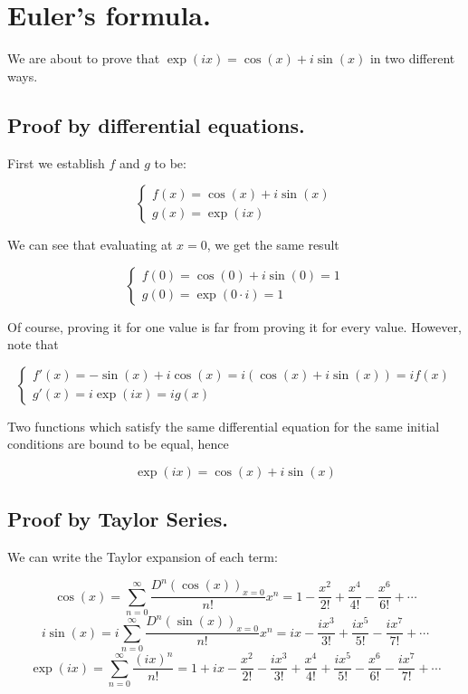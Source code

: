 \section{Euler's formula.}

We are about to prove that $\exp(ix) = \cos(x) + i\sin(x)$ in two different ways.

\subsection{Proof by differential equations.}

First we establish $f$ and $g$ to be:

\begin{equation}
\begin{cases}
	f(x) = \cos(x) + i\sin(x) \\
	g(x) = \exp(ix)
\end{cases}
\end{equation}

We can see that evaluating at $x = 0$, we get the same result

\begin{equation}
\begin{cases}
	f(0) = \cos(0) + i\sin(0) = 1 \\
	g(0) = \exp(0\cdot i) = 1
\end{cases}
\end{equation}

Of course, proving it for one value is far from proving it for every value. However, note that

\begin{equation}
\begin{cases}
	f'(x) = -\sin(x) + i\cos(x) = i(\cos(x) + i\sin(x)) = if(x) \\
	g'(x) = i\exp(ix) = ig(x)
\end{cases}
\end{equation}

Two functions which satisfy the same differential equation for the same initial conditions are bound to be equal, hence

$$\exp(ix) = \cos(x) + i\sin(x)$$

\subsection{Proof by Taylor Series.}

We can write the Taylor expansion of each term:

$$\cos(x)  =  \sum\limits_{n=0}^{\infty} \frac{D^n(\cos(x))_{x=0}}{n!} x^n = 1 - \frac{x^2}{2!} + \frac{x^4}{4!} - \frac{x^6}{6!} + \cdots$$
$$i\sin(x) = i\sum\limits_{n=0}^{\infty} \frac{D^n(\sin(x))_{x=0}}{n!} x^n = ix - \frac{ix^3}{3!} + \frac{ix^5}{5!} - \frac{ix^7}{7!} + \cdots$$
$$\exp(ix) =  \sum\limits_{n=0}^{\infty} \frac{(ix)^n}{n!} = 1 + ix - \frac{x^2}{2!} - \frac{ix^3}{3!} + \frac{x^4}{4!} + \frac{ix^5}{5!} - \frac{x^6}{6!} - \frac{ix^7}{7!} + \cdots$$


